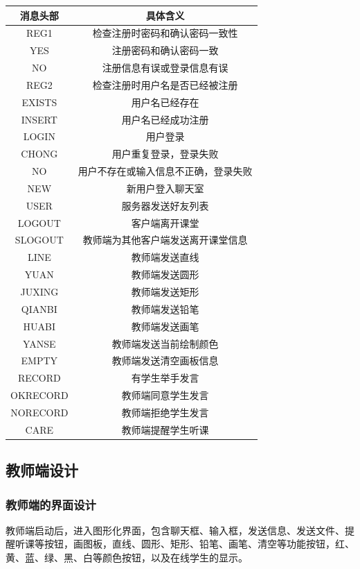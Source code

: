 \documentclass[UTF8,12pt]{article}
\begin{document}
\begin{tabular}{cc}
    \toprule
    消息头部 & 具体含义 \\
    \midrule
    REG1&检查注册时密码和确认密码一致性\\
    YES&注册密码和确认密码一致\\
    NO&注册信息有误或登录信息有误\\
    REG2&检查注册时用户名是否已经被注册\\
    EXISTS&用户名已经存在\\
    INSERT&用户名已经成功注册\\
    LOGIN&用户登录\\
    CHONG&用户重复登录，登录失败\\
    NO&用户不存在或输入信息不正确，登录失败\\
    NEW&新用户登入聊天室\\
    USER&服务器发送好友列表\\
    LOGOUT&客户端离开课堂\\
    SLOGOUT&教师端为其他客户端发送离开课堂信息\\
    LINE&教师端发送直线\\
    YUAN&教师端发送圆形\\
    JUXING&教师端发送矩形\\
    QIANBI&教师端发送铅笔\\
    HUABI&教师端发送画笔\\
    YANSE&教师端发送当前绘制颜色\\
    EMPTY&教师端发送清空画板信息\\
    RECORD&有学生举手发言\\
    OKRECORD&教师端同意学生发言\\
    NORECORD&教师端拒绝学生发言\\
    CARE&教师端提醒学生听课\\
    \bottomrule
\end{tabular}

\subsection{教师端设计}
\subsubsection{教师端的界面设计}
教师端启动后，进入图形化界面，包含聊天框、输入框，发送信息、发送文件、提醒听课等按钮，画图板，直线、圆形、矩形、铅笔、画笔、清空等功能按钮，红、黄、蓝、绿、黑、白等颜色按钮，以及在线学生的显示。
\end{document}
